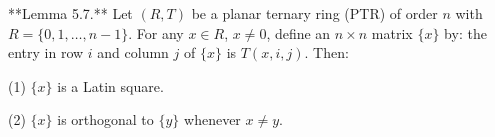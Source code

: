 **Lemma 5.7.** Let $(R, T)$ be a planar ternary ring (PTR) of order $n$ with $R = \{0, 1, \dots, n-1\}$. For any $x \in R$, $x \neq 0$, define an $n \times n$ matrix $\{x\}$ by: the entry in row $i$ and column $j$ of $\{x\}$ is $T(x, i, j)$. Then:

(1) $\{x\}$ is a Latin square.

(2) $\{x\}$ is orthogonal to $\{y\}$ whenever $x \neq y$.
